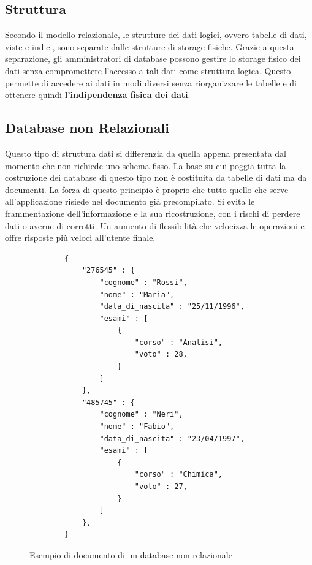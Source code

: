 \subsection{Struttura}
Secondo il modello relazionale, le strutture dei dati logici, ovvero tabelle di dati, viste e indici, sono separate dalle strutture di storage fisiche. Grazie a questa separazione, gli amministratori di database possono gestire lo storage fisico dei dati senza compromettere l'accesso a tali dati come struttura logica. Questo permette di accedere ai dati in modi diversi senza riorganizzare le tabelle e di ottenere quindi \textbf{l'indipendenza fisica dei dati}.

\subsection{Database non Relazionali}
Questo tipo di struttura dati si differenzia da quella appena presentata dal momento che non richiede uno schema fisso. La base su cui poggia tutta la costruzione dei database di questo tipo non è costituita da tabelle di dati ma da documenti. La forza di questo principio è proprio che tutto quello che serve all’applicazione risiede nel documento già precompilato. Si evita le frammentazione dell’informazione e la sua ricostruzione, con i rischi di perdere dati o averne di corrotti. Un aumento di flessibilità che velocizza le operazioni e offre risposte più veloci all'utente finale.
\begin{figure}[H]
    \centering
    \begin{verbatim}
        {
            "276545" : {
                "cognome" : "Rossi",
                "nome" : "Maria",
                "data_di_nascita" : "25/11/1996",
                "esami" : [
                    {
                        "corso" : "Analisi",
                        "voto" : 28,
                    }
                ]
            },
            "485745" : {
                "cognome" : "Neri",
                "nome" : "Fabio",
                "data_di_nascita" : "23/04/1997",
                "esami" : [
                    {
                        "corso" : "Chimica",
                        "voto" : 27,
                    }
                ]
            },
        }
    \end{verbatim}
    \caption{Esempio di documento di un database non relazionale}
    \label{fig:nonrelational-database}
\end{figure}

